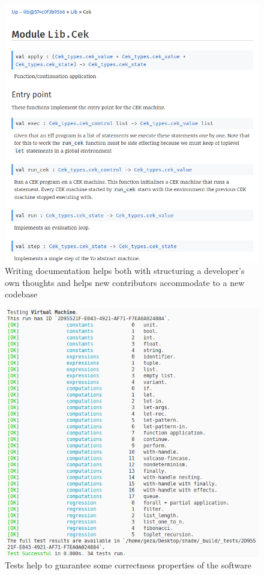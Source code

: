 \begin{figure}[h]
    \centering
    \includegraphics[height=.7\textheight]{screenshots/documentation.png}

    \caption[Documentation]{Writing documentation helps both with structuring a developer's own
    thoughts and helps new contributors accommodate to a new codebase}
    \label{fig:app-screenshot-documentation}
\end{figure}

\begin{figure}[h]
    \centering
    \includegraphics[height=.43\textheight]{screenshots/tests.png}

    \caption[Unit tests]{Tests help to guarantee some correctness properties of the software}
    \label{fig:app-screenshot-tests}
\end{figure}

